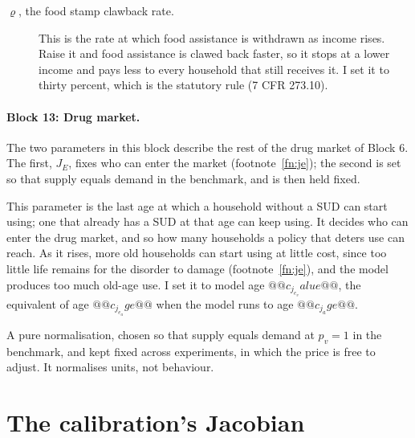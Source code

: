 \documentclass[10pt]{article}
\begin{document}
\begin{description}
\item[$\varrho$, the food stamp clawback rate.] This is the rate at which food assistance is withdrawn as income rises. Raise it and food assistance is clawed back faster, so it stops at a lower income and pays less to every household that still receives it. I set it to thirty percent, which is the statutory rule (7 CFR 273.10).
\end{description}

\paragraph{Block 13: Drug market.} The two parameters in this block describe the rest of the drug
market of Block 6. The first, $J_E$, fixes who can enter the market (footnote~\ref{fn:je}); the second is set so that supply equals demand in the benchmark, and is
then held fixed.
\begin{description}\setlength{\itemsep}{0.25em}\setlength{\parskip}{0em}

\item[$J_E$, the last age at which use can begin.] This parameter is the last age at which a household without a SUD can start using; one that already has a SUD at that age can keep using. It decides who can enter the drug market, and so how many households a policy that deters use can reach. As it rises, more old households can start using at little cost, since too little life remains for the disorder to damage (footnote~\ref{fn:je}), and the model produces too much old-age use. I set it to model age $@@c_j_e_value@@$, the equivalent of age $@@c_j_e_age@@$ when the model runs to age $@@c_j_age@@$.

\item[$\nu_1$, the supply shifter.] A pure normalisation, chosen so that supply
equals demand at $p_v=1$ in the benchmark, and kept fixed across experiments, in which the price is free to adjust. It normalises units, not behaviour.

\end{description}

\clearpage
\setcounter{figure}{0}
\section{The calibration's Jacobian}\label{sec:jacobian}
\end{document}
